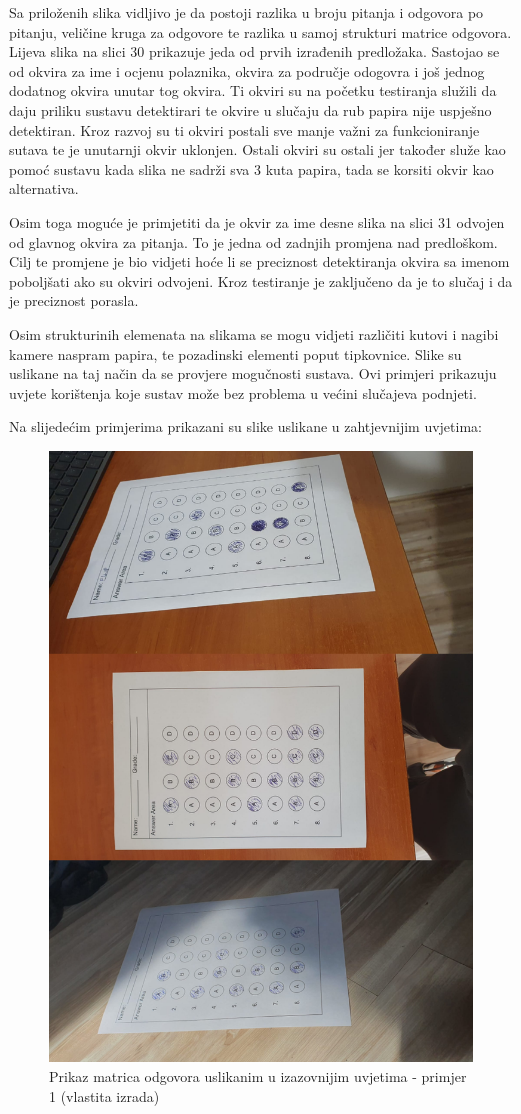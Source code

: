 \documentclass{foi}
\begin{document}
Sa priloženih slika vidljivo je da postoji razlika u  broju pitanja i odgovora po pitanju, veličine kruga za odgovore te razlika u samoj strukturi matrice odgovora. Lijeva slika na slici 30 prikazuje jeda od prvih izrađenih predložaka. Sastojao se od okvira za ime i ocjenu polaznika, okvira za područje odogovra i još jednog dodatnog okvira unutar tog okvira. Ti okviri su na početku testiranja služili da daju priliku sustavu detektirari te okvire u slučaju da rub papira nije uspješno detektiran. Kroz razvoj su ti okviri postali sve manje važni za funkcioniranje sutava te je unutarnji okvir uklonjen. Ostali okviri su ostali jer također služe kao pomoć sustavu kada slika ne sadrži sva 3 kuta papira, tada se korsiti okvir kao alternativa.

Osim toga moguće je primjetiti da je okvir za ime desne slika na slici 31 odvojen od glavnog okvira za pitanja. To je jedna od zadnjih promjena nad predloškom. Cilj te promjene je bio vidjeti hoće li se preciznost detektiranja okvira sa imenom poboljšati ako su okviri odvojeni. Kroz testiranje je zaključeno da je to slučaj i da je preciznost porasla.

Osim strukturinih elemenata na slikama se mogu vidjeti različiti kutovi i nagibi kamere naspram papira, te pozadinski elementi poput tipkovnice. Slike su uslikane na taj način da se provjere mogučnosti sustava. Ovi primjeri prikazuju uvjete korištenja koje sustav može bez problema u većini slučajeva podnjeti.

Na slijedećim primjerima prikazani su slike uslikane u zahtjevnijim uvjetima:

\begin{figure}[H]
\centering
\includegraphics[width=0.5\linewidth]{slike/Test3.png}
\caption{Prikaz matrica odgovora uslikanim u izazovnijim uvjetima - primjer 1 (vlastita izrada)}
\end{figure}
\end{document}
